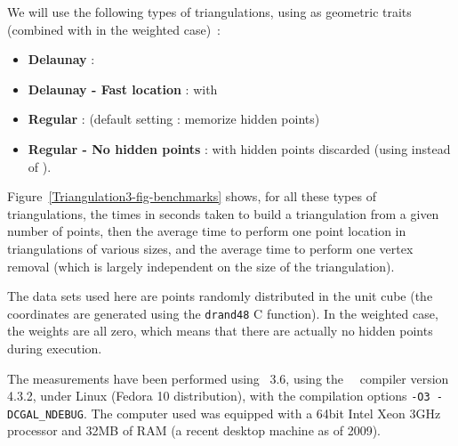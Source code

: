 We will use the following types of triangulations, using
 as geometric traits
(combined with  in the weighted
case)~:
\begin{itemize}
\item \textbf{Delaunay} : 
\item \textbf{Delaunay - Fast location} :  with 
\item \textbf{Regular} :  (default setting : memorize hidden points)
\item \textbf{Regular - No hidden points} :  with hidden points discarded (using
       instead of ).
\end{itemize}

Figure~\ref{Triangulation3-fig-benchmarks} shows, for all these types of
triangulations, the times in seconds taken to build a triangulation from a
given number of points, then the average time to perform one point location in
triangulations of various sizes, and the average time to perform one vertex
removal (which is largely independent on the size of the triangulation).

The data sets used here are points randomly distributed in the unit cube (the
coordinates are generated using the \texttt{drand48} C function).  In the
weighted case, the weights are all zero, which means that there are actually no
hidden points during execution.

The measurements have been performed using \cgal\ 3.6, using the \gnu\ \CC\ compiler
version 4.3.2, under Linux (Fedora 10 distribution), with the compilation options
\texttt{-O3 -DCGAL\_NDEBUG}.  The computer used was equipped with a 64bit Intel
Xeon 3GHz processor and 32MB of RAM (a recent desktop machine as of 2009).


